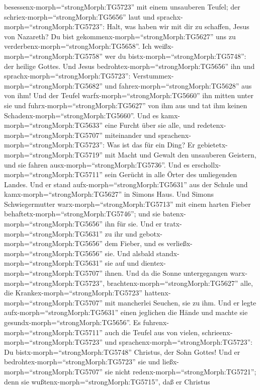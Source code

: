 besessenx-morph=``strongMorph:TG5723'' mit einem unsauberen Teufel; der
schriex-morph=``strongMorph:TG5656'' laut  und
sprachx-morph=``strongMorph:TG5723'': Halt, was haben wir mit dir zu
schaffen, Jesus von Nazareth? Du bist
gekommenx-morph=``strongMorph:TG5627'' uns zu
verderbenx-morph=``strongMorph:TG5658''. Ich
weißx-morph=``strongMorph:TG5758'' wer du
bistx-morph=``strongMorph:TG5748'': der heilige Gottes. 
Und Jesus bedrohtex-morph=``strongMorph:TG5656'' ihn und
sprachx-morph=``strongMorph:TG5723'':
Verstummex-morph=``strongMorph:TG5682'' und
fahrex-morph=``strongMorph:TG5628'' aus von ihm! Und der Teufel
warfx-morph=``strongMorph:TG5660'' ihn mitten unter sie und
fuhrx-morph=``strongMorph:TG5627'' von ihm aus und tat ihm keinen
Schadenx-morph=``strongMorph:TG5660''.  Und es
kamx-morph=``strongMorph:TG5633'' eine Furcht über sie alle, und
redetenx-morph=``strongMorph:TG5707'' miteinander und
sprachenx-morph=``strongMorph:TG5723'': Was ist das für ein Ding? Er
gebietetx-morph=``strongMorph:TG5719'' mit Macht und Gewalt den
unsauberen Geistern, und sie fahren ausx-morph=``strongMorph:TG5736''.
 Und es erschollx-morph=``strongMorph:TG5711'' sein Gerücht
in alle Örter des umliegenden Landes.  Und er stand
aufx-morph=``strongMorph:TG5631'' aus der Schule und
kamx-morph=``strongMorph:TG5627'' in Simons Haus. Und Simons
Schwiegermutter warx-morph=``strongMorph:TG5713'' mit einem harten
Fieber behaftetx-morph=``strongMorph:TG5746''; und sie
batenx-morph=``strongMorph:TG5656'' ihn für sie.  Und er
tratx-morph=``strongMorph:TG5631'' zu ihr und
gebotx-morph=``strongMorph:TG5656'' dem Fieber, und es
verließx-morph=``strongMorph:TG5656'' sie. Und alsbald
standx-morph=``strongMorph:TG5631'' sie auf und
dientex-morph=``strongMorph:TG5707'' ihnen.  Und da die
Sonne untergegangen warx-morph=``strongMorph:TG5723'',
brachtenx-morph=``strongMorph:TG5627'' alle, die
Krankex-morph=``strongMorph:TG5723''
hattenx-morph=``strongMorph:TG5707'' mit mancherlei Seuchen, sie zu ihm.
Und er legte aufx-morph=``strongMorph:TG5631'' einen jeglichen die Hände
und machte sie gesundx-morph=``strongMorph:TG5656''.  Es
fuhrenx-morph=``strongMorph:TG5711'' auch die Teufel aus von vielen,
schrieenx-morph=``strongMorph:TG5723'' und
sprachenx-morph=``strongMorph:TG5723'': Du
bistx-morph=``strongMorph:TG5748'' Christus, der Sohn Gottes! Und er
bedrohtex-morph=``strongMorph:TG5723'' sie und
ließx-morph=``strongMorph:TG5707'' sie nicht
redenx-morph=``strongMorph:TG5721''; denn sie
wußtenx-morph=``strongMorph:TG5715'', daß er Christus
